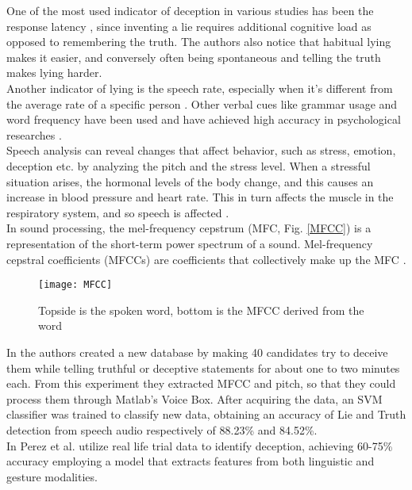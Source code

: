 One of the most used indicator of deception in various studies has been the response latency \cite{EaseLying}, since inventing a lie requires additional cognitive load as opposed to remembering the truth. The authors also notice that habitual lying makes it easier, and conversely often being spontaneous and telling the truth makes lying harder. \\
Another indicator of lying is the speech rate, especially when it's different from the average rate of a specific person \cite{TemporalCues}. Other verbal cues like grammar usage and word frequency have been used and have achieved high accuracy in psychological researches \cite{PorterTruthLying}.\\

Speech analysis can reveal changes that affect behavior, such as stress, emotion, deception etc. by analyzing the pitch and the stress level. When a stressful situation arises, the hormonal levels of the body change, and this causes an increase in blood pressure and heart rate. This in turn affects the muscle in the respiratory system, and so speech is affected \cite{norena}. \\

In sound processing, the mel-frequency cepstrum (MFC, Fig. \ref{MFCC}) is a representation of the short-term power spectrum of a sound. Mel-frequency cepstral coefficients (MFCCs) are coefficients that collectively make up the MFC \cite{wiki:mfcc}. \\
\begin{figure}[H]
	\centering
	\texttt{[image: MFCC]}
	\caption{Topside is the spoken word, bottom is the MFCC derived from the word}
	\label{fig:MFCC}
\end{figure}
In \cite{relidss} the authors created a new database by making 40 candidates try to deceive them while telling truthful or deceptive statements for about one to two minutes each. From this experiment they extracted MFCC and pitch, so that they could process them through Matlab's Voice Box. After acquiring the data, an SVM classifier was trained to classify new data, obtaining an accuracy of Lie and Truth detection from speech audio respectively of 88.23\% and 84.52\%. \\

In \cite{Perez-Rosas:2015:DDU:2818346.2820758} \cite{Mihalcea:2013:ADD:2522848.2522888} Perez et al. utilize real life trial data to identify deception, achieving 60-75\% accuracy employing a model that extracts features from both linguistic and gesture modalities.
 
